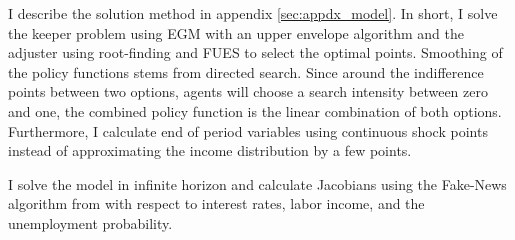 I describe the solution method in appendix \ref{sec:appdx_model}. In short, I solve the keeper problem using EGM with an upper envelope algorithm and the adjuster using root-finding and FUES to select the optimal points. Smoothing of the policy functions stems from directed search. Since around the indifference points between two options, agents will choose a search intensity between zero and one, the combined policy function is the linear combination of both options. Furthermore, I calculate end of period variables using continuous shock points instead of approximating the income distribution by a few points. 

I solve the model in infinite horizon and calculate Jacobians using the Fake-News algorithm from \cite{Auclert2021-gk} with respect to interest rates, labor income, and the unemployment probability.